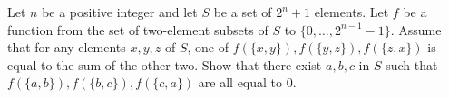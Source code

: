 Let $n$ be a positive integer and let $S$ be a set of $2^n+1$ elements. Let $f$ be a function from the set of two-element subsets of $S$ to $\{0, \dots, 2^{n-1}-1\}$. Assume that for any elements $x, y, z$ of $S$, one of $f(\{x,y\}), f(\{y,z\}), f(\{z, x\})$ is equal to the sum of the other two. Show that there exist $a, b, c$ in $S$ such that $f(\{a,b\}), f(\{b,c\}), f(\{c,a\})$ are all equal to 0.
